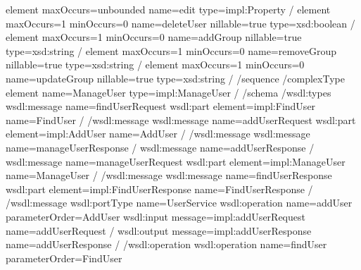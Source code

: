 \documentclass[letterpaper,10pt,english]{sphinxmanual}
\begin{document}
\begin{sphinxVerbatim}[commandchars=\\\{\}]
\PYGZlt{}element maxOccurs=\PYGZdq{}unbounded\PYGZdq{} name=\PYGZdq{}edit\PYGZdq{} type=\PYGZdq{}impl:Property\PYGZdq{} /\PYGZgt{}
\PYGZlt{}element maxOccurs=\PYGZdq{}1\PYGZdq{} minOccurs=\PYGZdq{}0\PYGZdq{} name=\PYGZdq{}deleteUser\PYGZdq{} nillable=\PYGZdq{}true\PYGZdq{} type=\PYGZdq{}xsd:boolean\PYGZdq{} /\PYGZgt{}
\PYGZlt{}element maxOccurs=\PYGZdq{}1\PYGZdq{} minOccurs=\PYGZdq{}0\PYGZdq{} name=\PYGZdq{}addGroup\PYGZdq{} nillable=\PYGZdq{}true\PYGZdq{} type=\PYGZdq{}xsd:string\PYGZdq{} /\PYGZgt{}
\PYGZlt{}element maxOccurs=\PYGZdq{}1\PYGZdq{} minOccurs=\PYGZdq{}0\PYGZdq{} name=\PYGZdq{}removeGroup\PYGZdq{} nillable=\PYGZdq{}true\PYGZdq{} type=\PYGZdq{}xsd:string\PYGZdq{} /\PYGZgt{}
\PYGZlt{}element maxOccurs=\PYGZdq{}1\PYGZdq{} minOccurs=\PYGZdq{}0\PYGZdq{} name=\PYGZdq{}updateGroup\PYGZdq{} nillable=\PYGZdq{}true\PYGZdq{} type=\PYGZdq{}xsd:string\PYGZdq{} /\PYGZgt{}
\PYGZlt{}/sequence\PYGZgt{}
\PYGZlt{}/complexType\PYGZgt{}
\PYGZlt{}element name=\PYGZdq{}ManageUser\PYGZdq{} type=\PYGZdq{}impl:ManageUser\PYGZdq{} /\PYGZgt{}
\PYGZlt{}/schema\PYGZgt{}
\PYGZlt{}/wsdl:types\PYGZgt{}
\PYGZlt{}wsdl:message name=\PYGZdq{}findUserRequest\PYGZdq{}\PYGZgt{}
\PYGZlt{}wsdl:part element=\PYGZdq{}impl:FindUser\PYGZdq{} name=\PYGZdq{}FindUser\PYGZdq{} /\PYGZgt{}
\PYGZlt{}/wsdl:message\PYGZgt{}
\PYGZlt{}wsdl:message name=\PYGZdq{}addUserRequest\PYGZdq{}\PYGZgt{}
\PYGZlt{}wsdl:part element=\PYGZdq{}impl:AddUser\PYGZdq{} name=\PYGZdq{}AddUser\PYGZdq{} /\PYGZgt{}
\PYGZlt{}/wsdl:message\PYGZgt{}
\PYGZlt{}wsdl:message name=\PYGZdq{}manageUserResponse\PYGZdq{} /\PYGZgt{}
\PYGZlt{}wsdl:message name=\PYGZdq{}addUserResponse\PYGZdq{} /\PYGZgt{}
\PYGZlt{}wsdl:message name=\PYGZdq{}manageUserRequest\PYGZdq{}\PYGZgt{}
\PYGZlt{}wsdl:part element=\PYGZdq{}impl:ManageUser\PYGZdq{} name=\PYGZdq{}ManageUser\PYGZdq{} /\PYGZgt{}
\PYGZlt{}/wsdl:message\PYGZgt{}
\PYGZlt{}wsdl:message name=\PYGZdq{}findUserResponse\PYGZdq{}\PYGZgt{}
\PYGZlt{}wsdl:part element=\PYGZdq{}impl:FindUserResponse\PYGZdq{} name=\PYGZdq{}FindUserResponse\PYGZdq{} /\PYGZgt{}
\PYGZlt{}/wsdl:message\PYGZgt{}
\PYGZlt{}wsdl:portType name=\PYGZdq{}UserService\PYGZdq{}\PYGZgt{}
\PYGZlt{}wsdl:operation name=\PYGZdq{}addUser\PYGZdq{} parameterOrder=\PYGZdq{}AddUser\PYGZdq{}\PYGZgt{}
\PYGZlt{}wsdl:input message=\PYGZdq{}impl:addUserRequest\PYGZdq{} name=\PYGZdq{}addUserRequest\PYGZdq{} /\PYGZgt{}
\PYGZlt{}wsdl:output message=\PYGZdq{}impl:addUserResponse\PYGZdq{} name=\PYGZdq{}addUserResponse\PYGZdq{} /\PYGZgt{}
\PYGZlt{}/wsdl:operation\PYGZgt{}
\PYGZlt{}wsdl:operation name=\PYGZdq{}findUser\PYGZdq{} parameterOrder=\PYGZdq{}FindUser\PYGZdq{}\PYGZgt{}

\end{sphinxVerbatim}
\end{document}
